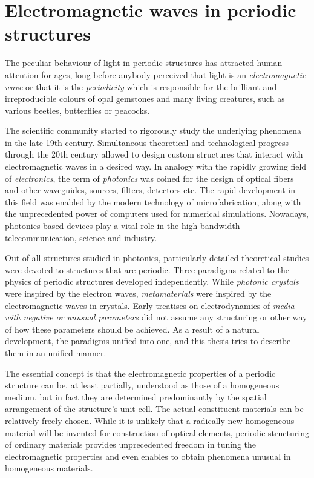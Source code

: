 
\section{Electromagnetic waves in periodic structures} %
The peculiar behaviour of light in periodic structures has attracted human attention for ages, long before anybody perceived that light is an \textit{electromagnetic wave} or that it is the \textit{periodicity} which is responsible for the brilliant and irreproducible colours of opal gemstones and many living creatures, such as various beetles, butterflies or peacocks. 

The scientific community started to rigorously study the underlying phenomena in the late 19th century.
Simultaneous theoretical and technological progress through the 20th century allowed to design custom structures that interact with electromagnetic waves in a desired way. In analogy with the rapidly growing field of \textit{electronics}, the term of \textit{photonics} was coined for the design of optical fibers and other waveguides, sources, filters, detectors etc. The rapid development in this field was enabled by the modern technology of microfabrication, along with the unprecedented power of computers used for numerical simulations. Nowadays, photonics-based devices play a vital role in the high-bandwidth telecommunication, science and industry.

Out of all structures studied in photonics, particularly detailed theoretical studies were devoted to structures that are periodic. Three paradigms related to the physics of periodic structures developed independently. While \textit{photonic crystals} were inspired by the electron waves, \textit{metamaterials} were inspired by the electromagnetic waves in crystals. Early treatises on electrodynamics of \textit{media with negative or unusual parameters} did not assume any structuring or other way of how these parameters should be achieved. As a result of a natural development, the paradigms unified into one, and this thesis tries to describe them in an unified manner.  %

The essential concept is that the electromagnetic properties of a periodic structure can be, at least partially, understood as those of a homogeneous medium, but in fact they are determined predominantly by the spatial arrangement of the structure's unit cell. The actual constituent materials can be relatively freely chosen. While it is unlikely that a radically new homogeneous material will be invented for construction of optical elements, periodic structuring of ordinary materials provides unprecedented freedom in tuning the electromagnetic properties and even enables to obtain phenomena unusual in homogeneous materials.  %

